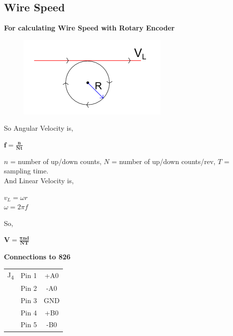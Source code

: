 \documentclass[12pt]{article}
\begin{document}
\clearpage

\subsection{Wire Speed}


\textbf{For calculating Wire Speed with Rotary Encoder}\\

\begin{figure}[h]
\centering
\includegraphics[scale=0.7]{speed1}
\end{figure}


So Angular Velocity is,

\begin{center}



$\boldsymbol{\displaystyle f=\frac{n}{\displaystyle Nt}}$\\
\end{center}

$n$ = number of up/down counts, $N$ = number of up/down counts/rev, $T$ = sampling time.\\


And Linear Velocity is,

\begin{center}



$\displaystyle v_L = \omega r$\\
$\displaystyle \omega = 2 \pi f $
\end{center}

So,

\begin{center}



$\boldsymbol{\displaystyle V = \frac{\pi nd}{NT}}$ \\

\end{center}



\textbf{Connections to 826}\\
\begin{center}


\begin{tabular}{c|c|c}
J\textsubscript{4} & Pin 1 & +A0 \\
& Pin 2 & -A0 \\
& Pin 3 & GND \\
& Pin 4 & +B0 \\
& Pin 5 & -B0 \\
\end{tabular}
\end{center}
\end{document}
